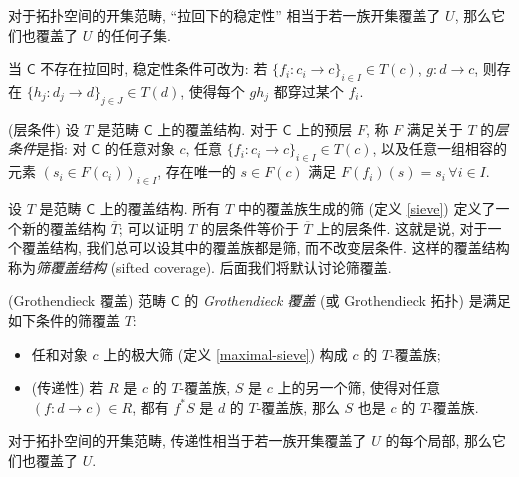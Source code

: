 对于拓扑空间的开集范畴, ``拉回下的稳定性'' 相当于若一族开集覆盖了 $U$, 那么它们也覆盖了 $U$ 的任何子集.

\begin{remark}
    {}
    当 $\mathsf C$ 不存在拉回时, 稳定性条件可改为: 若 $\{f_i \colon c_i \to c\}_{i\in I}\in T(c)$, $g \colon d \to c$,
    则存在 $\{h_j \colon d_j \to d\}_{j\in J}\in T(d)$,
    使得每个 $gh_j$ 都穿过某个 $f_i$.
\end{remark}


\begin{definition}
	{(层条件)}
	设 $T$ 是范畴 $\mathsf C$ 上的覆盖结构. 对于 $\mathsf C$ 上的预层 $F$, 称 $F$ 满足关于 $T$ 的\emph{层条件}是指:
	对 $\mathsf C$ 的任意对象 $c$, 任意 $\{f_i\colon c_i\to c\}_{i\in I}\in T(c)$,
	以及任意一组相容的元素 $(s_i\in F(c_i))_{i\in I}$,
	存在唯一的 $s\in F(c)$ 满足 $F(f_i)(s)=s_i\,\forall i\in I$.
\end{definition}

设 $T$ 是范畴 $\mathsf C$ 上的覆盖结构. 所有 $T$ 中的覆盖族生成的筛 (定义 \ref{sieve}) 定义了一个新的覆盖结构 $\overline{T}$; 可以证明 $T$ 的层条件等价于 $\overline{T}$ 上的层条件. 这就是说, 对于一个覆盖结构, 我们总可以设其中的覆盖族都是筛, 而不改变层条件.
这样的覆盖结构称为\emph{筛覆盖结构} (sifted coverage). 后面我们将默认讨论筛覆盖.

\begin{definition}
	[label={Grothendieck-topology}]
	{(Grothendieck 覆盖)}
	范畴 $\mathsf C$ 的 \emph{Grothendieck 覆盖} (或 Grothendieck 拓扑) 是满足如下条件的筛覆盖 $T$:
	\begin{itemize}
		\item 任和对象 $c$ 上的极大筛 (定义 \ref{maximal-sieve}) 构成 $c$ 的 $T$-覆盖族;
		\item (传递性) 若 $R$ 是 $c$ 的 $T$-覆盖族, $S$ 是 $c$ 上的另一个筛, 使得对任意 $(f\colon d\to c)\in R$, 都有 $f^*S$ 是 $d$ 的 $T$-覆盖族, 那么 $S$ 也是 $c$ 的 $T$-覆盖族.
	\end{itemize}
\end{definition}

对于拓扑空间的开集范畴, 传递性相当于若一族开集覆盖了 $U$ 的每个局部, 那么它们也覆盖了 $U$.

\begin{definition}
	{}
\end{definition}

